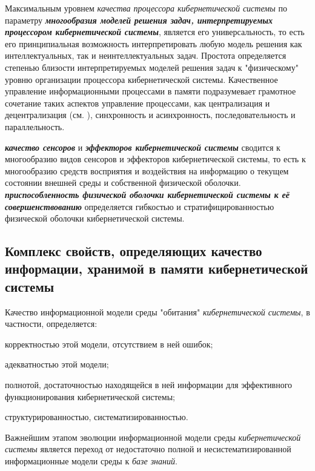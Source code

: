 Максимальным уровнем \textit{качества процессора кибернетической системы} по параметру \textbf{\textit{многообразия \textit{моделей решения задач}, интерпретируемых \textit{процессором кибернетической системы}}}, является его универсальность, то есть его принципиальная возможность интерпретировать любую модель решения как интеллектуальных, так и неинтеллектуальных задач. 
Простота определяется степенью близости интерпретируемых моделей решения задач к "физическому"{} уровню организации процессора кибернетической системы. 
Качественное управление информационными процессами в памяти подразумевает грамотное сочетание таких аспектов управление процессами, как централизация и децентрализация (см. ), синхронность и асинхронность, последовательность и параллельность.

\textbf{\textit{качество сенсоров}} и \textbf{\textit{эффекторов кибернетической системы}} сводится к многообразию видов сенсоров и эффекторов кибернетической системы, то есть к многообразию средств восприятия и воздействия на информацию о текущем состоянии внешней среды и собственной физической оболочки.
\textbf{\textit{приспособленность физической оболочки кибернетической системы к её совершенствованию}} определяется гибкостью и стратифицированностью физической оболочки кибернетической системы.

\subsection{Комплекс свойств, определяющих качество информации, хранимой в памяти кибернетической системы}
{\label{sec_cyb_syst_information_quality}} 

Качество информационной модели среды "обитания"{} \textit{кибернетической системы}, в частности, определяется:
\begin{textitemize}
    \item корректностью этой модели, отсутствием в ней ошибок;
    \item адекватностью этой модели;
    \item полнотой, достаточностью находящейся в ней информации для эффективного функционирования кибернетической системы;
    \item структурированностью, систематизированностью.
\end{textitemize}

Важнейшим этапом эволюции информационной модели среды \textit{кибернетической системы} является переход от недостаточно полной и несистематизированной информационные модели среды к \textit{базе знаний}.

